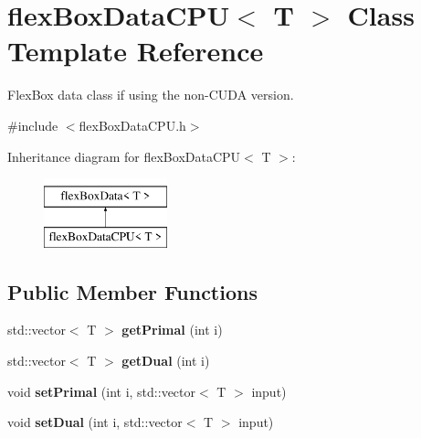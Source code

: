 \hypertarget{classflex_box_data_c_p_u}{}\section{flex\+Box\+Data\+C\+PU$<$ T $>$ Class Template Reference}
\label{classflex_box_data_c_p_u}


Flex\+Box data class if using the non-\/\+C\+U\+DA version.  




{\ttfamily \#include $<$flex\+Box\+Data\+C\+P\+U.\+h$>$}

Inheritance diagram for flex\+Box\+Data\+C\+PU$<$ T $>$\+:\begin{figure}[H]
\begin{center}
\leavevmode
\includegraphics[height=2.000000cm]{classflex_box_data_c_p_u}
\end{center}
\end{figure}
\subsection*{Public Member Functions}
\begin{DoxyCompactItemize}
\item 
\mbox{\label{classflex_box_data_c_p_u_a5465ee037c5120d2b1a4ef5bd53cc4d3}} 
std\+::vector$<$ T $>$ {\bfseries get\+Primal} (int i)
\item 
\mbox{\label{classflex_box_data_c_p_u_a2edf696e874b8bed946c4594be519e21}} 
std\+::vector$<$ T $>$ {\bfseries get\+Dual} (int i)
\item 
\mbox{\label{classflex_box_data_c_p_u_ab2144460b3769bc396fbba51b9bd29ee}} 
void {\bfseries set\+Primal} (int i, std\+::vector$<$ T $>$ input)
\item 
\mbox{\label{classflex_box_data_c_p_u_a9cdb107d16b65c6bcee32e4d44b0c5ef}} 
void {\bfseries set\+Dual} (int i, std\+::vector$<$ T $>$ input)
\end{DoxyCompactItemize}
